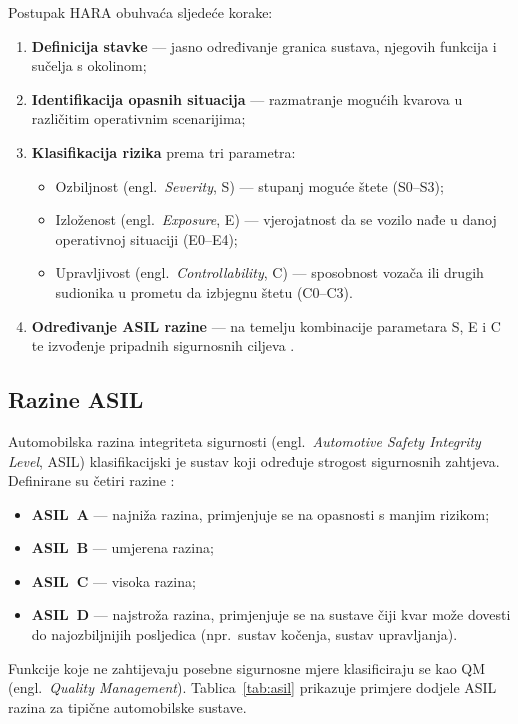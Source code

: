 Postupak HARA obuhvaća sljedeće korake:
\begin{enumerate}
  \item \textbf{Definicija stavke} — jasno određivanje granica sustava, njegovih funkcija i sučelja s okolinom;
  \item \textbf{Identifikacija opasnih situacija} — razmatranje mogućih kvarova u različitim operativnim scenarijima;
  \item \textbf{Klasifikacija rizika} prema tri parametra:
  \begin{itemize}
    \item Ozbiljnost (engl.\ \textit{Severity}, S) — stupanj moguće štete (S0--S3);
    \item Izloženost (engl.\ \textit{Exposure}, E) — vjerojatnost da se vozilo nađe u danoj operativnoj situaciji (E0--E4);
    \item Upravljivost (engl.\ \textit{Controllability}, C) — sposobnost vozača ili drugih sudionika u prometu da izbjegnu štetu (C0--C3).
  \end{itemize}
  \item \textbf{Određivanje ASIL razine} — na temelju kombinacije parametara S, E i C te izvođenje pripadnih sigurnosnih ciljeva \cite{bagschik2018hara}.
\end{enumerate}

\subsection{Razine ASIL}

Automobilska razina integriteta sigurnosti (engl.\ \textit{Automotive Safety Integrity Level}, ASIL) klasifikacijski je sustav koji određuje strogost sigurnosnih zahtjeva. Definirane su četiri razine \cite{iso26262}:

\begin{itemize}
  \item \textbf{ASIL~A} — najniža razina, primjenjuje se na opasnosti s manjim rizikom;
  \item \textbf{ASIL~B} — umjerena razina;
  \item \textbf{ASIL~C} — visoka razina;
  \item \textbf{ASIL~D} — najstroža razina, primjenjuje se na sustave čiji kvar može dovesti do najozbiljnijih posljedica (npr.\ sustav kočenja, sustav upravljanja).
\end{itemize}

Funkcije koje ne zahtijevaju posebne sigurnosne mjere klasificiraju se kao QM (engl.\ \textit{Quality Management}). Tablica~\ref{tab:asil} prikazuje primjere dodjele ASIL razina za tipične automobilske sustave.

